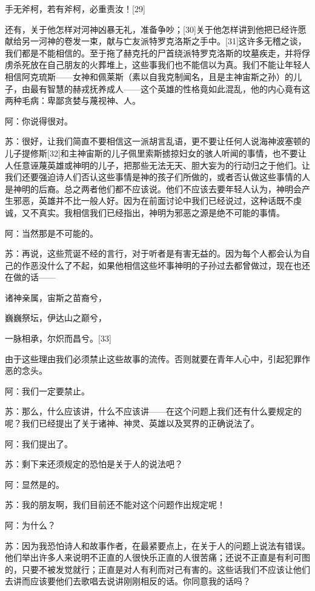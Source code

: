 \documentclass[12pt,oneside]{book}
\begin{document}
手无斧柯，若有斧柯，必重责汝！[29]





还有，关于他怎样对河神凶暴无礼，准备争吵；[30]关于他怎样讲到他把已经许愿献给另一河神的卷发一束，献与亡友派特罗克洛斯之手中。[31]这许多无稽之谈，我们都是不能相信的。至于拖了赫克托的尸首绕派特罗克洛斯的坟墓疾走，并将俘虏杀死放在自己朋友的火葬堆上，这些事我们也不能信以为真。我们不能让年轻人相信阿克琉斯——女神和佩莱斯（素以自我克制闻名，且是主神宙斯之孙）的儿子，由最有智慧的赫戎抚养成人——这个英雄的性格竟如此混乱，他的内心竟有这两种毛病：卑鄙贪婪与蔑视神、人。

阿：你说得很对。

苏：很好，让我们简直不要相信这一派胡言乱语，更不要让任何人说海神波塞顿的儿子提修斯[32]和主神宙斯的儿子佩里索斯掳掠妇女的骇人听闻的事情，也不要让人任意诬蔑英雄或神明的儿子，把那些无法无天、胆大妄为的行动归之于他们。让我们还要强迫诗人们否认这些事情是神的孩子们所做的，或者否认做这些事情的人是神明的后裔。总之两者他们都不应该说。他们不应该去要年轻人认为，神明会产生邪恶，英雄并不比一般人好。因为在前面讨论中我们已经说过，这种话既不虔诚，又不真实。我相信我们已经指出，神明为邪恶之源是绝不可能的事情。

阿：当然那是不可能的。

苏：再说，这些荒诞不经的言行，对于听者是有害无益的。因为每个人都会认为自己的作恶没什么了不起，如果他相信这些坏事神明的子孙过去都曾做过，现在也还在做的话——





诸神亲属，宙斯之苗裔兮，

巍巍祭坛，伊达山之巅兮，

一脉相承，尔炽而昌兮。[33]





由于这些理由我们必须禁止这些故事的流传。否则就要在青年人心中，引起犯罪作恶的念头。

阿：我们一定要禁止。

苏：那么，什么应该讲，什么不应该讲——在这个问题上我们还有什么要规定的呢？我们已经提出了关于诸神、神灵、英雄以及冥界的正确说法了。

阿：我们提出了。

苏：剩下来还须规定的恐怕是关于人的说法吧？

阿：显然是的。

苏：我的朋友啊，我们目前还不能对这个问题作出规定呢！

阿：为什么？

苏：因为我恐怕诗人和故事作者，在最紧要点上，在关于人的问题上说法有错误。他们举出许多人来说明不正直的人很快乐正直的人很苦痛；还说不正直是有利可图的，只要不被发觉就行；正直是对人有利而对己有害的。这些话我们不应该让他们去讲而应该要他们去歌唱去说讲刚刚相反的话。你同意我的话吗？
\end{document}
